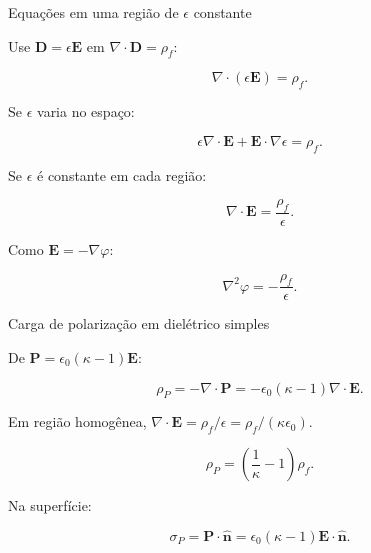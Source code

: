 \documentclass[aspectratio=169]{beamer}
\begin{document}
\begin{frame}{Equações em uma região de \(\epsilon\) constante}

\footnotesize

Use \(\mathbf D=\epsilon\mathbf E\) em \(\nabla\cdot\mathbf D=\rho_f\):

\[
\nabla\cdot(\epsilon\mathbf E)=\rho_f.
\]

Se \(\epsilon\) varia no espaço:

\begin{eqbox}
\begin{equation}
\epsilon\nabla\cdot\mathbf E
+
\mathbf E\cdot\nabla\epsilon
=
\rho_f.
\tag{6.38}
\end{equation}
\end{eqbox}

Se \(\epsilon\) é constante em cada região:

\begin{eqbox}
\begin{equation}
\nabla\cdot\mathbf E
=
\frac{\rho_f}{\epsilon}.
\tag{6.39}
\end{equation}
\end{eqbox}

Como \(\mathbf E=-\nabla\varphi\):

\begin{eqbox}
\begin{equation}
\nabla^2\varphi=-\frac{\rho_f}{\epsilon}.
\tag{6.40}
\end{equation}
\end{eqbox}

\end{frame}

\begin{frame}{Carga de polarização em dielétrico simples}

\small

De \(\mathbf P=\epsilon_0(\kappa-1)\mathbf E\):

\[
\rho_P=-\nabla\cdot\mathbf P
=
-\epsilon_0(\kappa-1)\nabla\cdot\mathbf E.
\]

Em região homogênea, \(\nabla\cdot\mathbf E=\rho_f/\epsilon=\rho_f/(\kappa\epsilon_0)\).

\begin{eqbox}
\begin{equation}
\rho_P
=
\left(\frac{1}{\kappa}-1\right)\rho_f.
\tag{6.43}
\label{eq:rhoP-simple}
\end{equation}
\end{eqbox}

Na superfície:

\begin{eqbox}
\begin{equation}
\sigma_P
=
\mathbf P\cdot\hat{\mathbf n}
=
\epsilon_0(\kappa-1)\mathbf E\cdot\hat{\mathbf n}.
\tag{6.44}
\label{eq:sigmaP-simple}
\end{equation}
\end{eqbox}

\end{frame}
\end{document}
